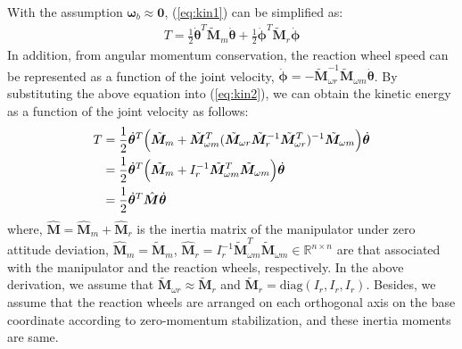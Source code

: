 \documentclass[preprint,12pt]{elsarticle}
\def\eq#1{{(\ref{eq:#1})}}
\def\R#1{{\in\mathbb{R}^{#1}}}
\def\thd{{\dot{\bbm{\theta}}}}
\def\phd{{\dot{{\bbm{\phi}}}}}
\def\tbm#1{{\tilde{\bbm{#1}}}}
\def\bbm#1{\bm{#1}}
\begin{document}
With the assumption $\bm{\omega}_{b} \approx \bm{0}$,
\eq{kin1} can be simplified as:
%
\begin{align}
  T = \frac{1}{2}\thd^{T}\tbm{M}_{m}\thd + \frac{1}{2}\phd^{T}\tbm{M}_{r}\phd\label{eq:kin2}
\end{align}
%
In addition,
from angular momentum conservation,
the reaction wheel speed can be represented as a function of the joint velocity,
$\phd = -\tbm{M}_{\omega r}^{-1}\tbm{M}_{\omega m}\thd$.
By substituting the above equation into \eq{kin2},
we can obtain the kinetic energy as a function of the joint velocity as follows:
%
\begin{align}
  T &= \frac{1}{2}\thd^{T}\Big(\tbm{M}_{m} + 
  \tbm{M}_{\omega m}^{T}(\tbm{M}_{\omega r}\tbm{M}_{r}^{-1}\tbm{M}_{\omega r}^{T})^{-1}\tbm{M}_{\omega m}\Big)\thd \notag\\
  &= \frac{1}{2}\thd^{T}\Big(\tbm{M}_{m} + I_{r}^{-1}\tbm{M}_{\omega m}^{T}\tbm{M}_{\omega m}\Big)\thd \notag\\
  &= \frac{1}{2}\thd^{T}\hat{\bm{M}}\thd\label{eq:kin}
\end{align}
%
where,
$\hat{\bm{M}} = \hat{\bm{M}}_{m} + \hat{\bm{M}}_{r}$ is the inertia matrix of the manipulator
under zero attitude deviation,
$\hat{\bm{M}}_{m} = \tbm{M}_{m}$,
$\hat{\bm{M}}_{r} = I_{r}^{-1}\tbm{M}_{\omega m}^{T}\tbm{M}_{\omega m}\R{n \times n}$ are
that associated with the manipulator and the reaction wheels, respectively.
In the above derivation,
we assume that $\tbm{M}_{\omega r} \approx \tbm{M}_{r}$ and $\tbm{M}_{r} = \mathrm{diag}(I_{r},I_{r},I_{r})$.
Besides, we assume that the reaction wheels are arranged on each orthogonal axis on the base coordinate according to
zero-momentum stabilization, and these inertia moments are same.


\end{document}
